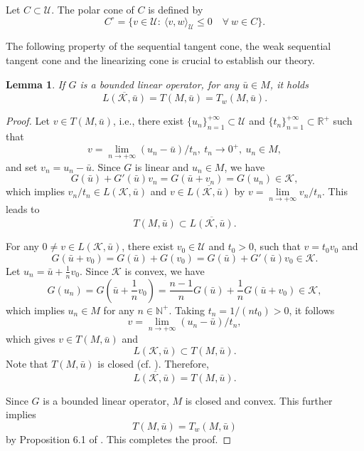 \documentclass[leqno]{amsart}
\newtheorem{lemma}[theorem]{Lemma}
\theoremstyle{definition}
\begin{document}
Let $C\subset \mathcal{U}$. The polar cone of $C$ is defined by
\begin{equation}\label{eq:dual_cone}
C^\circ = \{v\in \mathcal{U} :\ \langle v, w\rangle_{\mathcal{U}}\leq 0\quad \forall\ w\in C\}.
\end{equation}

The following property of the sequential tangent cone,  the weak sequential tangent cone and the linearizing cone is crucial to establish our theory.

\begin{lemma}\label{lem:TL_L}
If $G$ is a bounded linear operator, for any $\bar{u}\in M$, it holds
\begin{equation}\label{eq:TL_L}
  \overline{L(\mathcal{K}, \bar{u})} = T(M, \bar{u}) = T_w(M, \bar{u}).
\end{equation}
\end{lemma}

\begin{proof}
Let $v\in T(M, \bar{u})$, i.e., there exist $\{u_n\}_{n=1}^{+\infty}\subset \mathcal{U}$ and $\{t_n\}_{n=1}^{+\infty}\subset \mathbb{R}^+$ such that 
$$v = \lim\limits_{n\rightarrow +\infty}(u_n - \bar{u})/t_n,\ t_n\rightarrow 0^+,\ u_n\in M,$$%
and set $v_n = u_n - \bar{u}$.
Since $G$ is linear and $u_n\in M$, we have
$$G(\bar{u}) + G'(\bar{u})v_n = G(\bar{u} + v_n) = G(u_n)\in \mathcal{K},$$
which implies $v_n/t_n \in L(\mathcal{K}, \bar{u})$ and $v\in \overline{L(\mathcal{K}, \bar{u})}$ by $v = \lim\limits_{n\rightarrow +\infty}v_n/t_n$. This leads to %
$$T(M, \bar{u}) \subset \overline{L(\mathcal{K}, \bar{u})}.$$

For any $0\neq v\in L(\mathcal{K}, \bar{u})$, there exist $v_0\in \mathcal{U}$ and $t_0 > 0$, such that $v = t_0v_0$ and
$$G(\bar{u} + v_0) =  G(\bar{u}) + G(v_0) = G(\bar{u}) + G'(\bar{u})v_0 \in \mathcal{K}.$$
Let  $u_n = \bar{u} +\frac{1}{n}v_0.$ Since $\mathcal{K}$ is convex, we have
$$ G(u_n) = G(\bar{u} +\frac{1}{n}v_0) = \frac{n-1}{n}G(\bar{u}) + \frac{1}{n}G(\bar{u} + v_0) \in \mathcal{K},$$
which implies $u_n \in M$ for any $n\in \mathbb{N}^+$.
Taking $t_n = 1/(nt_0)>0$, it follows
$$ v = \lim\limits_{n\rightarrow +\infty}(u_n - \bar{u})/t_n,$$%
which gives $v\in T(M, \bar{u})$ and 
$$L(\mathcal{K}, \bar{u})\subset  T(M, \bar{u}).$$
Note that $T(M, \bar{u})$ is closed (cf. \cite[Theorem 4.10]{jahn2020introduction}). Therefore,
$$\overline{L(\mathcal{K}, \bar{u})} = T(M, \bar{u}).$$ 

Since $G$ is a bounded linear operator, $M$ is closed and convex. This further implies
$$T(M, \bar{u}) = T_w(M, \bar{u})$$
by Proposition 6.1 of  \cite{gould1975optimality}.
This completes the proof.
\end{proof}
\end{document}
